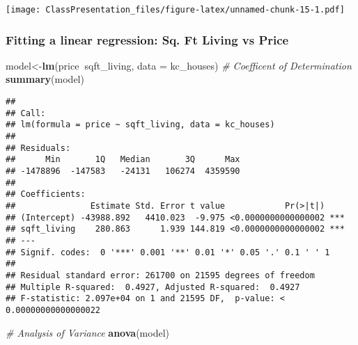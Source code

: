 \documentclass[]{article}
\newenvironment{Shaded}{\begin{snugshade}}{\end{snugshade}}
\newcommand{\CommentTok}[1]{\textcolor[rgb]{0.56,0.35,0.01}{\textit{#1}}}
\newcommand{\DataTypeTok}[1]{\textcolor[rgb]{0.13,0.29,0.53}{#1}}
\newcommand{\KeywordTok}[1]{\textcolor[rgb]{0.13,0.29,0.53}{\textbf{#1}}}
\newcommand{\NormalTok}[1]{#1}
\newcommand{\OperatorTok}[1]{\textcolor[rgb]{0.81,0.36,0.00}{\textbf{#1}}}
\newcommand{\StringTok}[1]{\textcolor[rgb]{0.31,0.60,0.02}{#1}}
\begin{document}
\begin{Shaded}
\end{Shaded}

\texttt{[image: ClassPresentation\_files/figure-latex/unnamed-chunk-15-1.pdf]}

\hypertarget{fitting-a-linear-regression-sq.-ft-living-vs-price}{%
\subsubsection{Fitting a linear regression: Sq. Ft Living vs
Price}\label{fitting-a-linear-regression-sq.-ft-living-vs-price}}

\begin{Shaded}
\begin{Highlighting}[]
\NormalTok{model<-}\KeywordTok{lm}\NormalTok{(price}\OperatorTok{~}\NormalTok{sqft_living, }\DataTypeTok{data =}\NormalTok{ kc_houses)}
\CommentTok{# Coefficent of Determination}
\KeywordTok{summary}\NormalTok{(model)}
\end{Highlighting}
\end{Shaded}

\begin{verbatim}
## 
## Call:
## lm(formula = price ~ sqft_living, data = kc_houses)
## 
## Residuals:
##      Min       1Q   Median       3Q      Max 
## -1478896  -147583   -24131   106274  4359590 
## 
## Coefficients:
##               Estimate Std. Error t value            Pr(>|t|)    
## (Intercept) -43988.892   4410.023  -9.975 <0.0000000000000002 ***
## sqft_living    280.863      1.939 144.819 <0.0000000000000002 ***
## ---
## Signif. codes:  0 '***' 0.001 '**' 0.01 '*' 0.05 '.' 0.1 ' ' 1
## 
## Residual standard error: 261700 on 21595 degrees of freedom
## Multiple R-squared:  0.4927, Adjusted R-squared:  0.4927 
## F-statistic: 2.097e+04 on 1 and 21595 DF,  p-value: < 0.00000000000000022
\end{verbatim}

\begin{Shaded}
\begin{Highlighting}[]
\CommentTok{# Analysis of Variance}
\KeywordTok{anova}\NormalTok{(model)}
\end{Highlighting}
\end{Shaded}
\end{document}
